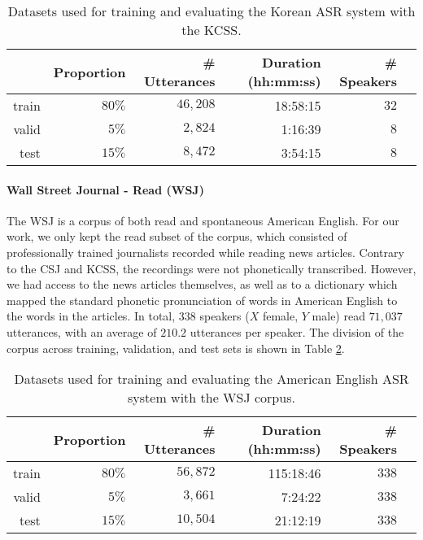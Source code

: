 \begin{table}[htb]
\centering
\caption{Datasets used for training and evaluating the Korean ASR system with the KCSS.}
\label{tab:hmm_kcss}
\vspace{0.25cm}
\begin{tabular}{rrrrrr}
  \toprule
      & Proportion & \# Utterances & Duration (hh:mm:ss) & \# Speakers &  \\ \midrule
  train & $80\%$ &  $46,208$ &   18:58:15   &   $32$    &  \\
  valid & $5\%$ &  $2,824$ &  1:16:39  &  $8$  &  \\
  test  & $15\%$ &  $8,472$ & 3:54:15   & $8$    & \\ \bottomrule
\end{tabular}
\end{table}

\paragraph{Wall Street Journal - Read (WSJ)}
The WSJ \cite{paul1992} is a corpus of both read and spontaneous American English.
For our work, we only kept the read subset of the corpus, which consisted of {\color{red}professionally trained journalists} recorded while reading news articles. Contrary to the CSJ and KCSS, the recordings were not phonetically transcribed. However, we had access to the news articles themselves, as well as to a dictionary which mapped the standard phonetic pronunciation of words in American English to the words in the articles.
In total, $338$ speakers {\color{red}($X$ female, $Y$ male)} read $71,037$ utterances, with an average of $210.2$ utterances per speaker. The division of the corpus across training, validation, and test sets is shown in Table \ref{tab:hmm_wsj}. 

\begin{table}[htb]
\centering
\caption{Datasets used for training and evaluating the American English ASR system with the WSJ corpus.}
\label{tab:hmm_wsj}
\vspace{0.25cm}
\begin{tabular}{rrrrrr}
  \toprule
      & Proportion & \# Utterances & Duration (hh:mm:ss) & \# Speakers &  \\ \midrule
  train & $80\%$ &  $56,872$ &   115:18:46   &   $338$    &  \\
  valid & $5\%$ &  $3,661$ &  7:24:22  &  $338$  &  \\
  test  & $15\%$ &  $10,504$ & 21:12:19  & $338$    & \\ \bottomrule
\end{tabular}
\end{table}
      
